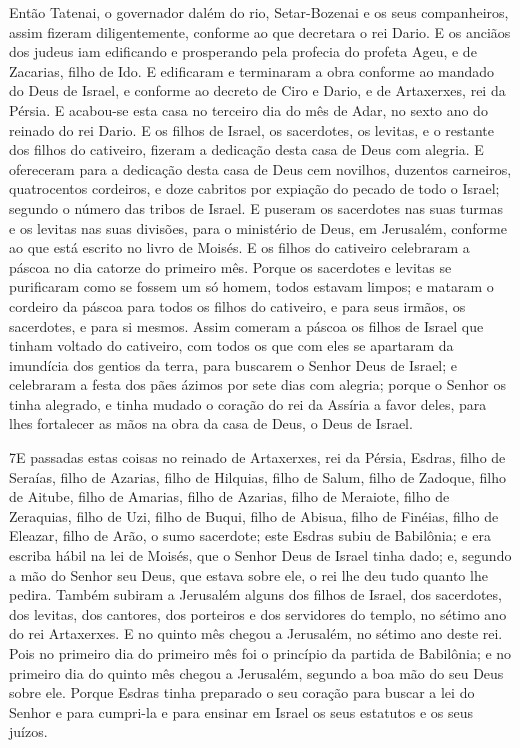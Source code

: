 Então Tatenai, o governador dalém do rio, Setar-Bozenai e os seus
companheiros, assim fizeram diligentemente, conforme ao que
decretara o rei Dario. E os anciãos dos judeus iam edificando
e prosperando pela profecia do profeta Ageu, e de Zacarias, filho de
Ido. E edificaram e terminaram a obra conforme ao mandado do Deus de
Israel, e conforme ao decreto de Ciro e Dario, e de Artaxerxes, rei
da Pérsia. E acabou-se esta casa no terceiro dia do mês de
Adar, no sexto ano do reinado do rei Dario. E os filhos de
Israel, os sacerdotes, os levitas, e o restante dos filhos do
cativeiro, fizeram a dedicação desta casa de Deus com alegria.
E ofereceram para a dedicação desta casa de Deus cem
novilhos, duzentos carneiros, quatrocentos cordeiros, e doze
cabritos por expiação do pecado de todo o Israel; segundo o número
das tribos de Israel. E puseram os sacerdotes nas suas turmas
e os levitas nas suas divisões, para o ministério de Deus, em
Jerusalém, conforme ao que está escrito no livro de Moisés. E
os filhos do cativeiro celebraram a páscoa no dia catorze do
primeiro mês. Porque os sacerdotes e levitas se purificaram
como se fossem um só homem, todos estavam limpos; e mataram o
cordeiro da páscoa para todos os filhos do cativeiro, e para seus
irmãos, os sacerdotes, e para si mesmos. Assim comeram a
páscoa os filhos de Israel que tinham voltado do cativeiro, com
todos os que com eles se apartaram da imundícia dos gentios da
terra, para buscarem o Senhor Deus de Israel; e celebraram a
festa dos pães ázimos por sete dias com alegria; porque o Senhor os
tinha alegrado, e tinha mudado o coração do rei da Assíria a favor
deles, para lhes fortalecer as mãos na obra da casa de Deus, o Deus
de Israel.

\medskip

\lettrine{7} E passadas estas coisas no reinado de Artaxerxes,
rei da Pérsia, Esdras, filho de Seraías, filho de Azarias, filho de
Hilquias, filho de Salum, filho de Zadoque, filho de Aitube,
filho de Amarias, filho de Azarias, filho de Meraiote, filho
de Zeraquias, filho de Uzi, filho de Buqui, filho de Abisua,
filho de Finéias, filho de Eleazar, filho de Arão, o sumo sacerdote;
este Esdras subiu de Babilônia; e era escriba hábil na lei de
Moisés, que o Senhor Deus de Israel tinha dado; e, segundo a mão do
Senhor seu Deus, que estava sobre ele, o rei lhe deu tudo quanto lhe
pedira. Também subiram a Jerusalém alguns dos filhos de Israel,
dos sacerdotes, dos levitas, dos cantores, dos porteiros e dos
servidores do templo, no sétimo ano do rei Artaxerxes. E no
quinto mês chegou a Jerusalém, no sétimo ano deste rei. Pois no
primeiro dia do primeiro mês foi o princípio da partida de
Babilônia; e no primeiro dia do quinto mês chegou a Jerusalém,
segundo a boa mão do seu Deus sobre ele. Porque Esdras tinha
preparado o seu coração para buscar a lei do Senhor e para cumpri-la
e para ensinar em Israel os seus estatutos e os seus juízos.


